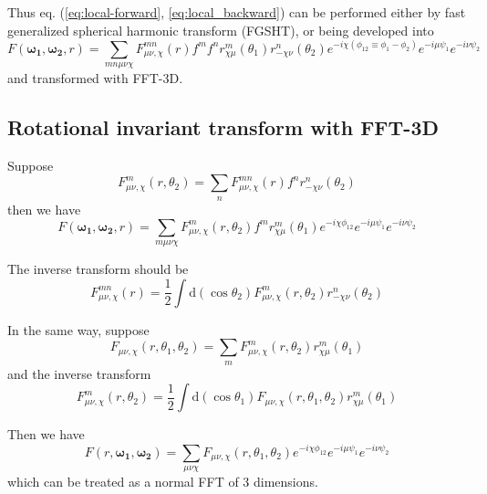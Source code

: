 Thus eq. (\ref{eq:local-forward}, \ref{eq:local_backward}) can be
performed either by fast generalized spherical harmonic transform
(FGSHT), or being developed into
\begin{equation}
F(\boldsymbol{\omega_{1}},\boldsymbol{\omega_{2}},r)=\sum_{mn\mu\nu\chi}F_{\mu\nu,\chi}^{mn}(r)f^{m}f^{n}r_{\chi\mu}^{m}(\theta_{1})r_{-\chi\nu}^{n}(\theta_{2})e^{-i\chi(\phi_{12}\equiv\phi_{1}-\phi_{2})}e^{-i\mu\psi_{1}}e^{-i\nu\psi_{2}}\label{eq:eq_s1_local}
\end{equation}
and transformed with FFT-3D.


\subsection{Rotational invariant transform with FFT-3D}

Suppose
\begin{equation}
F_{\mu\nu,\chi}^{m}(r,\theta_{2})=\sum_{n}F_{\mu\nu,\chi}^{mn}(r)f^{n}r_{-\chi\nu}^{n}(\theta_{2})
\end{equation}
then we have
\begin{equation}
F(\boldsymbol{\omega_{1}},\boldsymbol{\omega_{2}},r)=\sum_{m\mu\nu\chi}F_{\mu\nu,\chi}^{m}(r,\theta_{2})f^{m}r_{\chi\mu}^{m}(\theta_{1})e^{-i\chi\phi_{12}}e^{-i\mu\psi_{1}}e^{-i\nu\psi_{2}}
\end{equation}


The inverse transform should be
\begin{equation}
F_{\mu\nu,\chi}^{mn}(r)=\frac{1}{2}\int\mathrm{d}(\cos\theta_{2})F_{\mu\nu,\chi}^{m}(r,\theta_{2})r_{-\chi\nu}^{n}(\theta_{2})
\end{equation}


In the same way, suppose
\begin{equation}
F_{\mu\nu,\chi}(r,\theta_{1},\theta_{2})=\sum_{m}F_{\mu\nu,\chi}^{m}(r,\theta_{2})r_{\chi\mu}^{m}(\theta_{1})
\end{equation}
and the inverse transform
\begin{equation}
F_{\mu\nu,\chi}^{m}(r,\theta_{2})=\frac{1}{2}\int\mathrm{d}(\cos\theta_{1})F_{\mu\nu,\chi}(r,\theta_{1},\theta_{2})r_{\chi\mu}^{m}(\theta_{1})
\end{equation}


Then we have
\begin{equation}
F(r,\boldsymbol{\omega_{1}},\boldsymbol{\omega_{2}})=\sum_{\mu\nu\chi}F_{\mu\nu,\chi}(r,\theta_{1},\theta_{2})e^{-i\chi\phi_{12}}e^{-i\mu\psi_{1}}e^{-i\nu\psi_{2}}\label{eq:eq_s3_local}
\end{equation}
which can be treated as a normal FFT of 3 dimensions.


